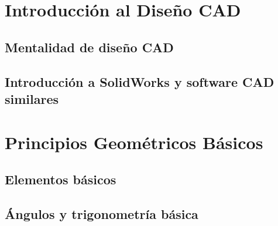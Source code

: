 \section{Introducción al Diseño CAD}

\subsection{Mentalidad de diseño CAD}

\subsection{Introducción a SolidWorks y software CAD similares}

\section{Principios Geométricos Básicos}

\subsection{Elementos básicos}

\subsection{Ángulos y trigonometría básica}

